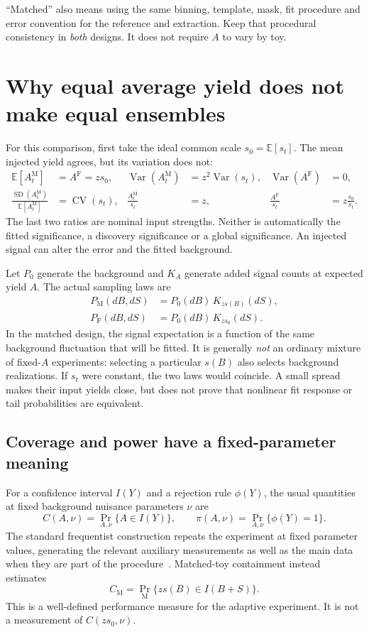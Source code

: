 \documentclass[11pt]{article}
\newcommand{\E}{\mathbb E}
\newcommand{\Var}{\operatorname{Var}}
\newcommand{\CV}{\operatorname{CV}}
\begin{document}
``Matched'' also means using the same binning, template, mask, fit procedure
and error convention for the reference and extraction. Keep that procedural
consistency in \emph{both} designs. It does not require $A$ to vary by toy.

\clearpage
\section{Why equal average yield does not make equal ensembles}
For this comparison, first take the ideal common scale $s_0=\E[s_t]$.
The mean injected yield agrees, but its variation does not:
\begin{align}
 \E[A_t^{\mathrm M}]&=A^{\mathrm F}=z s_0,&
 \Var(A_t^{\mathrm M})&=z^2\Var(s_t),&
 \Var(A^{\mathrm F})&=0,\\
 \frac{\operatorname{SD}(A_t^{\mathrm M})}{\E[A_t^{\mathrm M}]}&=\CV(s_t),&
 \frac{A_t^{\mathrm M}}{s_t}&=z,&
 \frac{A^{\mathrm F}}{s_t}&=z\frac{s_0}{s_t}.
 \label{eq:spread}
\end{align}
The last two ratios are nominal input strengths. Neither is automatically
the fitted significance, a discovery significance or a global significance.
An injected signal can alter the error and the fitted background.

Let $P_0$ generate the background and $K_A$ generate added signal counts at
expected yield $A$. The actual sampling laws are
\begin{align}
 P_{\mathrm M}(dB,dS)&=P_0(dB)\,K_{z s(B)}(dS),\\
 P_{\mathrm F}(dB,dS)&=P_0(dB)\,K_{z s_0}(dS).
 \label{eq:laws}
\end{align}
In the matched design, the signal expectation is a function of the same
background fluctuation that will be fitted. It is generally \emph{not} an
ordinary mixture of fixed-$A$ experiments: selecting a particular $s(B)$
also selects background realizations. If $s_t$ were constant, the two laws
would coincide. A small spread makes their input yields close, but does not
prove that nonlinear fit response or tail probabilities are equivalent.

\subsection*{Coverage and power have a fixed-parameter meaning}
For a confidence interval $I(Y)$ and a rejection rule $\phi(Y)$, the usual
quantities at fixed background nuisance parameters $\nu$ are
\begin{equation}
 C(A,\nu)=\Pr_{A,\nu}\{A\in I(Y)\},\qquad
 \pi(A,\nu)=\Pr_{A,\nu}\{\phi(Y)=1\}.
 \label{eq:coverage}
\end{equation}
The standard frequentist construction repeats the experiment at fixed
parameter values, generating the relevant auxiliary measurements as well
as the main data when they are part of the procedure~\cite{pdg}.
Matched-toy containment instead estimates
\begin{equation}
 C_{\mathrm M}=\Pr_{\mathrm M}\{z s(B)\in I(B+S)\}.
\end{equation}
This is a well-defined performance measure for the adaptive experiment.
It is not a measurement of $C(zs_0,\nu)$.
\end{document}
